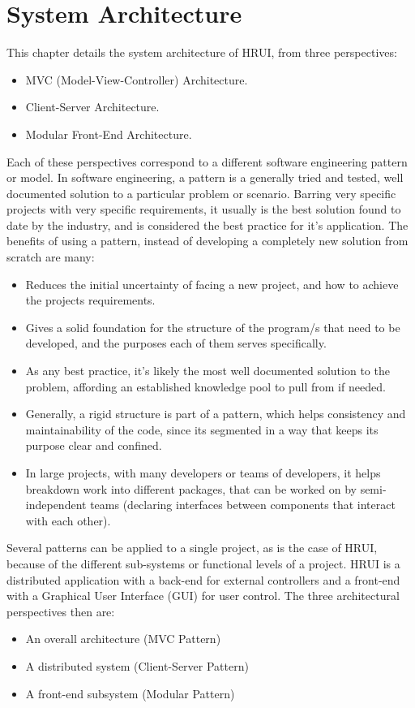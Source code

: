 \chapter{System Architecture} \label{systemarchitecture}
This chapter details the system architecture of HRUI, from three perspectives:
\begin{itemize}
	\item MVC (Model-View-Controller) Architecture.
	\item Client-Server Architecture.
	\item Modular Front-End Architecture.
\end{itemize}
Each of these perspectives correspond to a different software engineering pattern or model. In software engineering, a 
pattern is a generally tried and tested, well documented solution to a particular problem or scenario. Barring very 
specific projects with very specific requirements, it usually is the best solution found to date by the industry, and is 
considered the best practice for it's application. The benefits of using a pattern, instead of developing a completely new 
solution from scratch are many:
\begin{itemize}
	\item Reduces the initial uncertainty of facing a new project, and how to achieve the projects requirements.
	\item Gives a solid foundation for the structure of the program/s that need to be developed, and the purposes each of 
	them serves specifically.
	\item As any best practice, it's likely the most well documented solution to the problem, affording an established 
	knowledge pool to pull from if needed.
	\item Generally, a rigid structure is part of a pattern, which helps consistency and maintainability of the code, since 
	its segmented in a way that keeps its purpose clear and confined.
	\item In large projects, with many developers or teams of developers, it helps breakdown work into different packages, 
	that can be worked on by semi-independent teams (declaring interfaces between components that interact with each other).
\end{itemize}
Several patterns can be applied to a single project, as is the case of HRUI, because of the different sub-systems or 
functional levels of a project. HRUI is a distributed application with a back-end for external controllers and a front-end
with a Graphical User Interface (GUI) for user control. The three architectural perspectives then are:
\begin{itemize}
	\item An overall architecture (MVC Pattern)
	\item A distributed system (Client-Server Pattern)
	\item A front-end subsystem (Modular Pattern)
\end{itemize}
